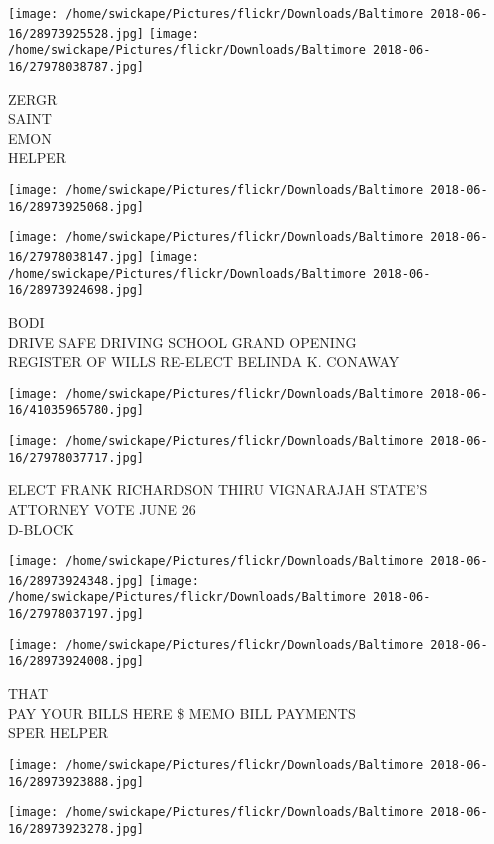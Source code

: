 \documentclass[10pt,letterpaper]{article}
\begin{document}
\texttt{[image: /home/swickape/Pictures/flickr/Downloads/Baltimore 2018-06-16/28973925528.jpg]}
\texttt{[image: /home/swickape/Pictures/flickr/Downloads/Baltimore 2018-06-16/27978038787.jpg]}

ZERGR\\
SAINT\\
EMON\\
HELPER
\pagebreak

\texttt{[image: /home/swickape/Pictures/flickr/Downloads/Baltimore 2018-06-16/28973925068.jpg]}

\vspace{0.25in}
\texttt{[image: /home/swickape/Pictures/flickr/Downloads/Baltimore 2018-06-16/27978038147.jpg]}
\texttt{[image: /home/swickape/Pictures/flickr/Downloads/Baltimore 2018-06-16/28973924698.jpg]}

BODI\\
DRIVE SAFE DRIVING SCHOOL GRAND OPENING\\
REGISTER OF WILLS RE{-}ELECT BELINDA K. CONAWAY
\pagebreak

\texttt{[image: /home/swickape/Pictures/flickr/Downloads/Baltimore 2018-06-16/41035965780.jpg]}

\vspace{0.25in}
\texttt{[image: /home/swickape/Pictures/flickr/Downloads/Baltimore 2018-06-16/27978037717.jpg]}

ELECT FRANK RICHARDSON THIRU VIGNARAJAH STATE'S ATTORNEY VOTE JUNE 26\\
D{-}BLOCK
\pagebreak

\texttt{[image: /home/swickape/Pictures/flickr/Downloads/Baltimore 2018-06-16/28973924348.jpg]}
\texttt{[image: /home/swickape/Pictures/flickr/Downloads/Baltimore 2018-06-16/27978037197.jpg]}

\texttt{[image: /home/swickape/Pictures/flickr/Downloads/Baltimore 2018-06-16/28973924008.jpg]}

THAT\\
PAY YOUR BILLS HERE \$ MEMO BILL PAYMENTS\\
SPER HELPER
\pagebreak

\texttt{[image: /home/swickape/Pictures/flickr/Downloads/Baltimore 2018-06-16/28973923888.jpg]}

\vspace{0.25in}
\texttt{[image: /home/swickape/Pictures/flickr/Downloads/Baltimore 2018-06-16/28973923278.jpg]}
\end{document}
